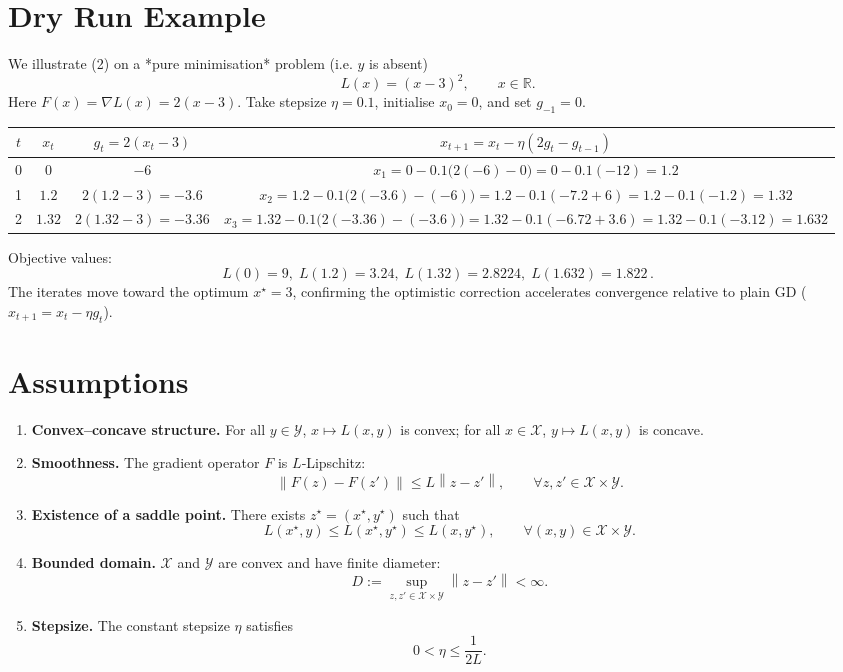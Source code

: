 \documentclass{article}
\newcommand{\R}{\mathbb{R}}
\newcommand{\norm}[1]{\left\lVert#1\right\rVert}
\begin{document}
\section*{Dry Run Example}
We illustrate (2) on a *pure minimisation* problem (i.e. $y$ is absent)  
\[
L(x)= (x-3)^2,\qquad x\in\R .
\]
Here $F(x)=\nabla L(x)=2(x-3)$.  
Take stepsize $\eta=0.1$, initialise $x_0=0$, and set $g_{-1}=0$.

\begin{center}
\begin{tabular}{c|c|c|c}
$t$ & $x_t$ & $g_t=2(x_t-3)$ & $x_{t+1}=x_t-\eta(2g_t-g_{t-1})$\\\hline
0 & $0$ & $-6$ & $x_1 =0-0.1\bigl(2(-6)-0\bigr)=0-0.1(-12)=1.2$\\
1 & $1.2$ & $2(1.2-3)=-3.6$ & $x_2 =1.2-0.1\bigl(2(-3.6)-(-6)\bigr)=1.2-0.1(-7.2+6)=1.2-0.1(-1.2)=1.32$\\
2 & $1.32$ & $2(1.32-3)=-3.36$ & $x_3 =1.32-0.1\bigl(2(-3.36)-(-3.6)\bigr)=1.32-0.1(-6.72+3.6)=1.32-0.1(-3.12)=1.632$\\
\end{tabular}
\end{center}
Objective values:
\[
L(0)=9,\;L(1.2)=3.24,\;L(1.32)=2.8224,\;L(1.632)=1.822\, .
\]
The iterates move toward the optimum $x^\star=3$, confirming the optimistic correction accelerates convergence relative to plain GD ($x_{t+1}=x_t-\eta g_t$).

\newpage
\section*{Assumptions}
\begin{enumerate}[label={A\arabic*}.]
\item \textbf{Convex–concave structure.} For all $y\in\mathcal Y$, $x\mapsto L(x,y)$ is convex; for all $x\in\mathcal X$, $y\mapsto L(x,y)$ is concave.
\item \textbf{Smoothness.} The gradient operator $F$ is $L$‑Lipschitz:
\[
\norm{F(z)-F(z')}\le L\norm{z-z'},\qquad\forall z,z'\in\mathcal X\times\mathcal Y .
\]
\item \textbf{Existence of a saddle point.} There exists $z^\star=(x^\star,y^\star)$ such that
\[
L(x^\star,y)\le L(x^\star,y^\star)\le L(x,y^\star),\qquad\forall (x,y)\in\mathcal X\times\mathcal Y .
\]
\item \textbf{Bounded domain.} $\mathcal X$ and $\mathcal Y$ are convex and have finite diameter:
\[
D:=\sup_{z,z'\in\mathcal X\times\mathcal Y}\norm{z-z'}<\infty .
\]
\item \textbf{Stepsize.} The constant stepsize $\eta$ satisfies 
\[
0<\eta\le\frac{1}{2L}.
\tag{3}
\]
\end{enumerate}
\end{document}
